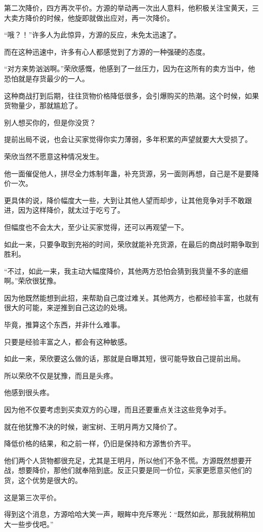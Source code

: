 \begin{this_body}
第二次降价，四方再次平价。方源的举动再一次出人意料，他积极关注宝黄天，三大卖方降价的时候，他旋即就做出应对，再一次降价。

“哦？！”许多人为此惊异，方源的反应，未免太迅速了。

而在这种迅速中，许多有心人都感觉到了方源的一种强硬的态度。

“对方来势汹汹啊。”荣欣感慨，他感到了一丝压力，因为在这所有的卖方当中，他恐怕就是存货最少的一人。

这种商战打到后期，往往货物价格降低很多，会引爆购买的热潮。这个时候，如果货物量少，那就尴尬了。

别人想买你的，但是你没货？

提前出局不说，也会让买家觉得你实力薄弱，多年积累的声望就要大大受损了。

荣欣当然不愿意这种情况发生。

他一面催促他人，拼尽全力炼制年蛊，补充货源，另一面则再想，自己是不是要降价一次。

更具体的说，降价幅度大一些，大到让其他人望而却步，让其他竞争对手不敢跟进，因为这样降价，就太过于吃亏了。

但幅度也不会太大，至少让买家觉得，还可以再观望一下。

如此一来，只要争取到充裕的时间，荣欣就能补充货源，在最后的商战时期争取到胜利。

“不过，如此一来，我主动大幅度降价，其他两方恐怕会猜到我货量不多的底细啊。”荣欣很犹豫。

因为他既然能想到此招，来帮助自己度过难关。其他两方，也都经验丰富，也就有很大的可能，来逆推到自己这边的处境。

毕竟，推算这个东西，并非什么难事。

只要是经验丰富之人，都会有这种敏感。

如此一来，荣欣要这么做的话，那就是自曝其短，很可能导致自己提前出局。

所以荣欣不仅是犹豫，而且是头疼。

他感到很头疼。

因为他不仅要考虑到买卖双方的心理，而且还要重点关注这些竞争对手。

就在他犹豫不决的时候，谢宝树、王明月两方又降价了。

降低价格的结果，和之前一样，仍旧是保持和方源售价齐平。

他们两个人货物都很充足，尤其是王明月，所以他们不急不慌。方源既然想要开战，想要降价，那他们就奉陪到底。反正只要是同一价位，买家更愿意买他们的货，这个优势是很大的。

这是第三次平价。

得到这个消息，方源哈哈大笑一声，眼眸中充斥寒光：“既然如此，那我就稍稍加大一些步伐吧。”


\end{this_body}
